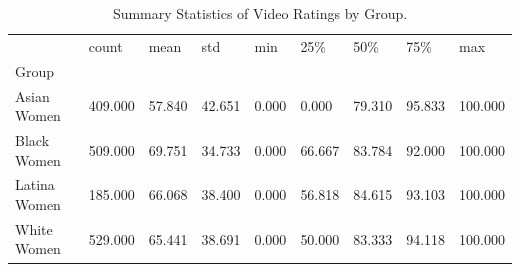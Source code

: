 \begin{table}[htbp]
\centering
\caption{Summary Statistics of Video Ratings by Group.}
\label{tab:eda_rating_stats}
\begin{tabular}{lllllllll}
\toprule
 & count & mean & std & min & 25\% & 50\% & 75\% & max \\
Group &  &  &  &  &  &  &  &  \\
\midrule
Asian Women & 409.000 & 57.840 & 42.651 & 0.000 & 0.000 & 79.310 & 95.833 & 100.000 \\
Black Women & 509.000 & 69.751 & 34.733 & 0.000 & 66.667 & 83.784 & 92.000 & 100.000 \\
Latina Women & 185.000 & 66.068 & 38.400 & 0.000 & 56.818 & 84.615 & 93.103 & 100.000 \\
White Women & 529.000 & 65.441 & 38.691 & 0.000 & 50.000 & 83.333 & 94.118 & 100.000 \\
\bottomrule
\end{tabular}

\end{table}